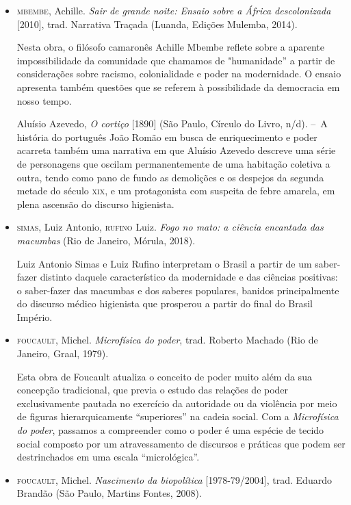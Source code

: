 \documentclass[12pt]{extarticle}
\begin{document}
\begin{itemize}
\item \textsc{mbembe}, Achille. \emph{Sair de grande noite: Ensaio sobre a África
descolonizada} {[}2010{]}, trad. Narrativa Traçada (Luanda, Edições
Mulemba, 2014).

Nesta obra, o filósofo camaronês Achille Mbembe
reflete sobre a aparente impossibilidade da comunidade que chamamos de
"humanidade'' a partir de considerações sobre racismo, colonialidade e
poder na modernidade. O ensaio apresenta também questões que se referem
à possibilidade da democracia em nosso tempo.


Aluísio Azevedo, \emph{O cortiço} {[}1890{]} (São Paulo, Círculo do
Livro, n/d). --~A história do português João Romão em busca de
enriquecimento e poder acarreta também uma narrativa em que Aluísio
Azevedo descreve uma série de personagens que oscilam permanentemente de
uma habitação coletiva a outra, tendo como pano de fundo as demolições e
os despejos da segunda metade do século \textsc{xix}, e um protagonista com
suspeita de febre amarela, em plena ascensão do discurso higienista.

\item \textsc{simas}, Luiz Antonio, \textsc{rufino} Luiz. \emph{Fogo no mato: a ciência
encantada das macumbas} (Rio de Janeiro, Mórula, 2018). 

Luiz Antonio
Simas e Luiz Rufino interpretam o Brasil a partir de um saber-fazer
distinto daquele característico da modernidade e das ciências positivas:
o saber-fazer das macumbas e dos saberes populares, banidos
principalmente do discurso médico higienista que prosperou a partir do
final do Brasil Império.

\item \textsc{foucault}, Michel. \emph{Microfísica do poder}, trad. Roberto Machado (Rio
de Janeiro, Graal, 1979). 

Esta obra de Foucault atualiza o conceito
de poder muito além da sua concepção tradicional, que previa o estudo
das relações de poder exclusivamente pautada no exercício da autoridade
ou da violência por meio de figuras hierarquicamente ``superiores'' na
cadeia social. Com a \emph{Microfísica do poder}, passamos a compreender
como o poder é uma espécie de tecido social composto por um
atravessamento de discursos e práticas que podem ser destrinchados em
uma escala ``micrológica''.

\item \textsc{foucault}, Michel. \emph{Nascimento da biopolítica} {[}1978-79/2004{]},
trad. Eduardo Brandão (São Paulo, Martins Fontes, 2008). 


\end{itemize}
\end{document}

